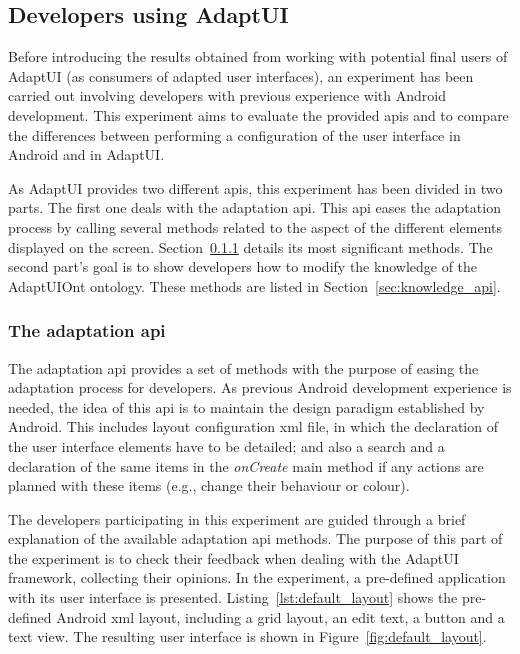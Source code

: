 \subsection{Developers using AdaptUI}
\label{sec:developers}

Before introducing the results obtained from working with potential final users
of AdaptUI (as consumers of adapted user interfaces), an experiment has been
carried out involving developers with previous experience with Android development.
This experiment aims to evaluate the provided \acp{api} and to compare the 
differences between performing a configuration of the user interface in Android
and in AdaptUI. 

As AdaptUI provides two different \acp{api}, this experiment has been divided
in two parts. The first one deals with the adaptation \ac{api}. This \ac{api}
eases the adaptation process by calling several methods related to the aspect of 
the different elements displayed on the screen. Section~\ref{sec:adaptation_api} 
details its most significant methods. The second part's goal is to show developers 
how to modify the knowledge of the AdaptUIOnt ontology. These methods are
listed in Section~\ref{sec:knowledge_api}.

\subsubsection{The adaptation \ac{api}}
\label{sec:adaptation_api}

The adaptation \ac{api} provides a set of methods with the purpose of easing the 
adaptation process for developers. As previous Android development experience
is needed, the idea of this \ac{api} is to maintain the design paradigm established
by Android. This includes layout configuration \ac{xml} file, in which the 
declaration of the user interface elements have to be detailed; and also a
search and a declaration of the same items in the \textit{onCreate} main method
if any actions are planned with these items (e.g., change their behaviour or
colour).

The developers participating in this experiment are guided through a brief 
explanation of the available adaptation \ac{api} methods. The purpose of this
part of the experiment is to check their feedback when dealing with the AdaptUI
framework, collecting their opinions. In the experiment, a pre-defined application
with its user interface is presented. Listing~\ref{lst:default_layout} shows the 
pre-defined Android \ac{xml} layout, including a grid layout, an edit text, a 
button and a text view. The resulting user interface is shown in Figure~\ref{fig:default_layout}.

